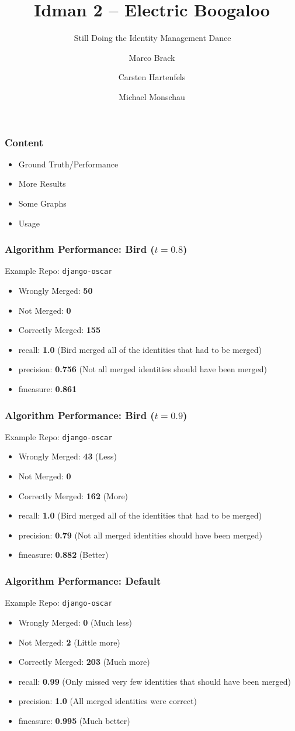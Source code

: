 \documentclass[slidestop,usenames,dvipsnames]{beamer}
\title{Idman 2 -- Electric Boogaloo}
\subtitle{💃💃💃\ Still Doing the Identity Management Dance 💃💃💃}
\author{Marco Brack \and Carsten Hartenfels \and Michael Monschau}
\newcommand{\gitem}{\vfill\item}
\begin{document}
\begin{frame}
    \titlepage
\end{frame}




\begin{frame}
    \frametitle{Content}
    \begin{itemize}
      \gitem Ground Truth/Performance
       \gitem More Results
       \gitem Some Graphs
       \gitem Usage
    \end{itemize}
    \vfill
\end{frame}


\begin{frame}
  \frametitle{Algorithm Performance: Bird ($t=0.8$)}
  Example Repo: \texttt{django-oscar}
  \begin{itemize}
    \gitem Wrongly Merged: \textbf{50}
    \gitem Not Merged: \textbf{0}
    \gitem Correctly Merged: \textbf{155}
  \end{itemize}
  \begin{itemize}
    \gitem recall: \textbf{1.0} (Bird merged all of the identities that had to be merged)
    \gitem precision: \textbf{0.756} (Not all merged identities should have been merged)
    \gitem fmeasure: \textbf{0.861}
  \end{itemize}
  \vfill
\end{frame}


\begin{frame}
  \frametitle{Algorithm Performance: Bird ($t=0.9$)}
  Example Repo: \texttt{django-oscar}
  \begin{itemize}
    \gitem Wrongly Merged: \textbf{43} (Less)
    \gitem Not Merged: \textbf{0}
    \gitem Correctly Merged: \textbf{162} (More)
  \end{itemize}
  \begin{itemize}
    \gitem recall: \textbf{1.0} (Bird merged all of the identities that had to be merged)
    \gitem precision: \textbf{0.79} (Not all merged identities should have been merged)
    \gitem fmeasure: \textbf{0.882} (Better)
  \end{itemize}
  \vfill
\end{frame}


\begin{frame}
  \frametitle{Algorithm Performance: Default}
  Example Repo: \texttt{django-oscar}
  \begin{itemize}
    \gitem Wrongly Merged: \textbf{0} (Much less)
    \gitem Not Merged: \textbf{2} (Little more)
    \gitem Correctly Merged: \textbf{203} (Much more)
  \end{itemize}
  \begin{itemize}
    \gitem recall: \textbf{0.99} (Only missed very few identities that should have been merged)
    \gitem precision: \textbf{1.0} (All merged identities were correct)
    \gitem fmeasure: \textbf{0.995} (Much better)
  \end{itemize}
  \vfill
\end{frame}
\end{document}
